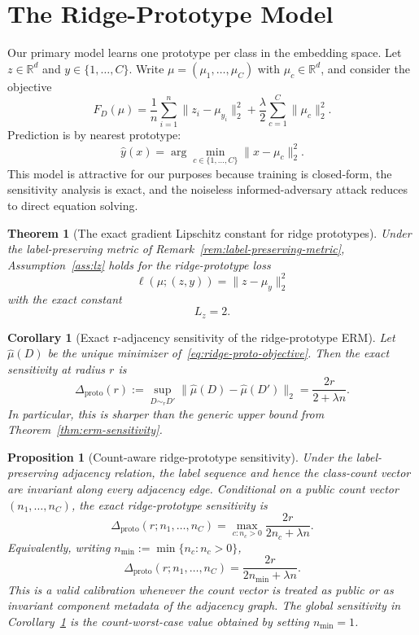 \documentclass[conference,compsoc]{IEEEtran}
\newtheorem{theorem}{Theorem}
\newtheorem{proposition}{Proposition}
\newtheorem{corollary}{Corollary}
\begin{document}
\section{The Ridge-Prototype Model}
\label{sec:ridge}

Our primary model learns one prototype per class in the embedding space. Let $z\in\mathbb{R}^d$ and $y\in\{1,\dots,C\}$. Write $\mu=(\mu_1,\dots,\mu_C)$ with $\mu_c\in\mathbb{R}^d$, and consider the objective
\begin{equation}
\label{eq:ridge-proto-objective}
F_D(\mu)=\frac{1}{n}\sum_{i=1}^n \|z_i-\mu_{y_i}\|_2^2+\frac{\lambda}{2}\sum_{c=1}^C \|\mu_c\|_2^2.
\end{equation}
Prediction is by nearest prototype:
\[
\widehat y(x)=\arg\min_{c\in\{1,\dots,C\}} \|x-\mu_c\|_2^2.
\]
This model is attractive for our purposes because training is closed-form, the sensitivity analysis is exact, and the noiseless informed-adversary attack reduces to direct equation solving.

\begin{theorem}[The exact gradient Lipschitz constant for ridge prototypes]
\label{thm:proto-lz}
Under the label-preserving metric of Remark~\ref{rem:label-preserving-metric}, Assumption~\ref{ass:lz} holds for the ridge-prototype loss
\[
\ell(\mu;(z,y))=\|z-\mu_y\|_2^2
\]
with the exact constant
\[
L_z=2.
\]
\end{theorem}

\begin{corollary}[Exact r-adjacency sensitivity of the ridge-prototype ERM]
\label{cor:proto-sensitivity}
Let $\widehat\mu(D)$ be the unique minimizer of~\eqref{eq:ridge-proto-objective}. Then the exact sensitivity at radius $r$ is
\[
\Delta_{\mathrm{proto}}(r)
:=
\sup_{D\sim_r D'} \|\widehat\mu(D)-\widehat\mu(D')\|_2
=
\frac{2r}{2+\lambda n}.
\]
In particular, this is sharper than the generic upper bound from Theorem~\ref{thm:erm-sensitivity}.
\end{corollary}

\begin{proposition}[Count-aware ridge-prototype sensitivity]
\label{prop:proto-count-aware-sensitivity}
Under the label-preserving adjacency relation, the label sequence and hence the class-count vector are invariant along every adjacency edge. Conditional on a public count vector $(n_1,\ldots,n_C)$, the exact ridge-prototype sensitivity is
\[
\Delta_{\mathrm{proto}}(r;n_1,\ldots,n_C)
=
\max_{c:n_c>0}\frac{2r}{2n_c+\lambda n}.
\]
Equivalently, writing $n_{\min}:=\min\{n_c:n_c>0\}$,
\[
\Delta_{\mathrm{proto}}(r;n_1,\ldots,n_C)
=
\frac{2r}{2n_{\min}+\lambda n}.
\]
This is a valid calibration whenever the count vector is treated as public or as invariant component metadata of the adjacency graph. The global sensitivity in Corollary~\ref{cor:proto-sensitivity} is the count-worst-case value obtained by setting $n_{\min}=1$.
\end{proposition}
\end{document}
